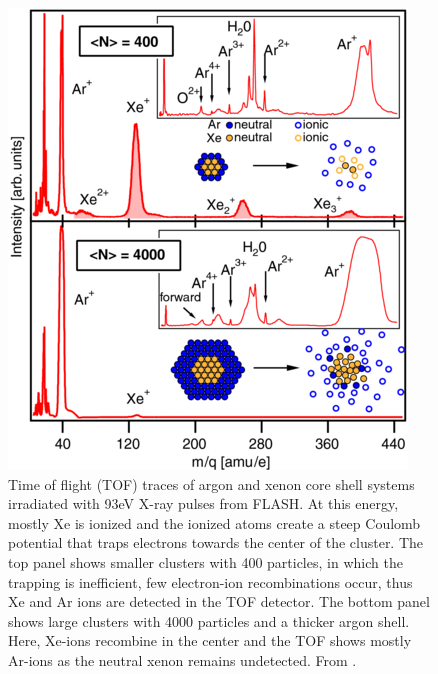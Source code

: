 \begin{figure}
	\centering
		\includegraphics[height=0.50\textwidth]{images/Hoener-image.jpg}
	\caption[Time of flight spectra of argon and xenon core-shell systems.]{Time of flight (TOF) traces of argon and xenon core shell systems irradiated with 93eV X-ray pulses from FLASH. At this energy, mostly Xe is ionized and the ionized atoms create a steep Coulomb potential that traps electrons towards the center of the cluster. The top panel shows smaller clusters with 400 particles, in which the trapping is inefficient, few electron-ion recombinations occur, thus Xe and Ar ions are detected in the TOF detector. The bottom panel shows large clusters with 4000 particles and a thicker argon shell. Here, Xe-ions recombine in the center and the TOF shows mostly Ar-ions as the neutral xenon remains undetected. From \citep[\href{https://creativecommons.org/licenses/by/3.0/}{\ccby}]{Hoener-2008-JPB}.}
	\label{fig:Hoener-image}
\end{figure}
